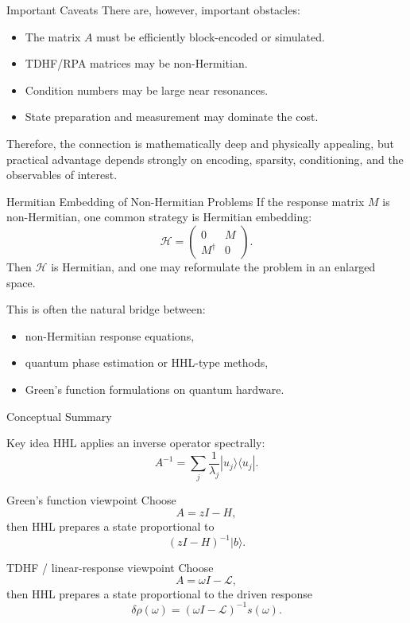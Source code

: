 \documentclass{beamer}
\begin{document}

\begin{frame}{Important Caveats}
  There are, however, important obstacles:
  \begin{itemize}
  \item The matrix \(A\) must be efficiently block-encoded or simulated.
  \item TDHF/RPA matrices may be non-Hermitian.
  \item Condition numbers may be large near resonances.
  \item State preparation and measurement may dominate the cost.
  \end{itemize}

  Therefore, the connection is mathematically deep and physically appealing, but practical advantage depends strongly on encoding, sparsity, conditioning, and the observables of interest.
\end{frame}


\begin{frame}{Hermitian Embedding of Non-Hermitian Problems}
  If the response matrix \(M\) is non-Hermitian, one common strategy is Hermitian embedding:
  \[
  \mathcal{H}
  =
  \begin{pmatrix}
    0 & M \\
    M^\dagger & 0
  \end{pmatrix}.
  \]
  Then \(\mathcal{H}\) is Hermitian, and one may reformulate the problem in an enlarged space.

  This is often the natural bridge between:
  \begin{itemize}
  \item non-Hermitian response equations,
  \item quantum phase estimation or HHL-type methods,
  \item Green's function formulations on quantum hardware.
  \end{itemize}
\end{frame}


\begin{frame}{Conceptual Summary}
  \begin{block}{Key idea}
    HHL applies an inverse operator spectrally:
    \[
    A^{-1} = \sum_j \frac{1}{\lambda_j}|u_j\rangle\langle u_j|.
    \]
  \end{block}

  \begin{block}{Green's function viewpoint}
    Choose
    \[
    A = zI - H,
    \]
    then HHL prepares a state proportional to
    \[
    (zI-H)^{-1}|b\rangle.
    \]
  \end{block}

  \begin{block}{TDHF / linear-response viewpoint}
    Choose
    \[
    A = \omega I - \mathcal{L},
    \]
    then HHL prepares a state proportional to the driven response
    \[
    \delta\rho(\omega) = (\omega I - \mathcal{L})^{-1} s(\omega).
    \]
  \end{block}
  \end{frame}
\end{document}
